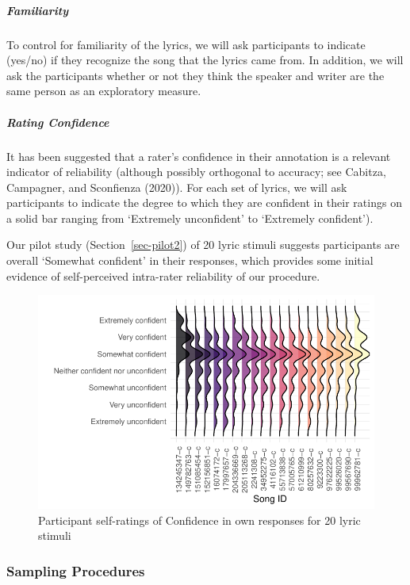 \documentclass[
  letterpaper,
  DIV=11,
  numbers=noendperiod]{scrartcl}
\let\oldsubparagraph\subparagraph
\renewcommand{\subparagraph}[1]{\oldsubparagraph{#1}\mbox{}}
\begin{document}
\hypertarget{familiarity}{%
\subparagraph{Familiarity}\label{familiarity}}

To control for familiarity of the lyrics, we will ask participants to
indicate (yes/no) if they recognize the song that the lyrics came from.
In addition, we will ask the participants whether or not they think the
speaker and writer are the same person as an exploratory measure.

\hypertarget{rating-confidence}{%
\subparagraph{Rating Confidence}\label{rating-confidence}}

It has been suggested that a rater's confidence in their annotation is a
relevant indicator of reliability (although possibly orthogonal to
accuracy; see Cabitza, Campagner, and Sconfienza (2020)). For each set
of lyrics, we will ask participants to indicate the degree to which they
are confident in their ratings on a solid bar ranging from `Extremely
unconfident' to `Extremely confident').

Our pilot study (Section~\ref{sec-pilot2}) of 20 lyric stimuli suggests
participants are overall `Somewhat confident' in their responses, which
provides some initial evidence of self-perceived intra-rater reliability
of our procedure.

\begin{figure}

{\centering \includegraphics{pre-registration_pdf_files/figure-pdf/fig-1-1.pdf}

}

\caption{\label{fig-1}Participant self-ratings of Confidence in own
responses for 20 lyric stimuli}

\end{figure}

\hypertarget{sec-sampling}{%
\subsubsection{Sampling Procedures}\label{sec-sampling}}
\end{document}
